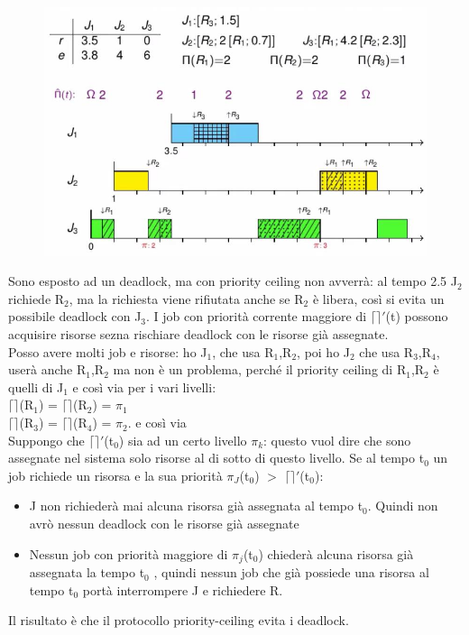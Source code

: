 \documentclass[12pt, oneside]{extbook}
\begin{document}
\begin{figure}[!h]
\centering
\includegraphics[scale=0.4]{immagini/image-025.jpg}
\end{figure}
Sono esposto ad un deadlock, ma con priority ceiling non avverrà: al tempo 2.5 J$_{2}$ richiede R$_{2}$, ma la richiesta viene rifiutata anche se R$_{2}$ è libera, così si evita un possibile deadlock con J$_{3}$. I job con priorità corrente maggiore di $\lceil\rceil'$(t) possono acquisire risorse sezna rischiare deadlock con le risorse già assegnate.\\ Posso avere molti job e risorse: ho J$_{1}$, che usa R$_{1}$,R$_{2}$, poi ho J$_{2}$ che usa R$_{3}$,R$_{4}$, userà anche R$_{1}$,R$_{2}$ ma non è un problema, perché il priority ceiling di R$_{1}$,R$_{2}$ è quelli di J$_{1}$ e così via per i vari livelli:\\
$\lceil\rceil$(R$_{1}$) = $\lceil\rceil$(R$_{2}$) = $\pi_{1}$\\
$\lceil\rceil$(R$_{3}$) = $\lceil\rceil$(R$_{4}$) = $\pi_{2}$.
e così via \\ Suppongo che $\lceil\rceil'$(t$_{0}$) sia ad un certo livello $\pi_{k}$: questo vuol dire che sono assegnate nel sistema solo risorse al di sotto di questo livello. Se al tempo t$_{0}$ un job richiede un risorsa e la sua priorità $\pi_{J}$(t$_{0}$) $>$ $\lceil\rceil'$(t$_{0}$):
\begin{itemize}
\item J non richiederà mai alcuna risorsa già assegnata al tempo t$_{0}$. Quindi non avrò nessun deadlock con le risorse già assegnate
\item Nessun job con priorità maggiore di $\pi_{j}$(t$_{0}$) chiederà alcuna risorsa già assegnata la tempo t$_{0}$ , quindi nessun job che già possiede una risorsa al tempo t$_{0}$ portà interrompere J e richiedere R.
\end{itemize}
Il risultato è che il protocollo priority-ceiling evita i deadlock.
\end{document}

